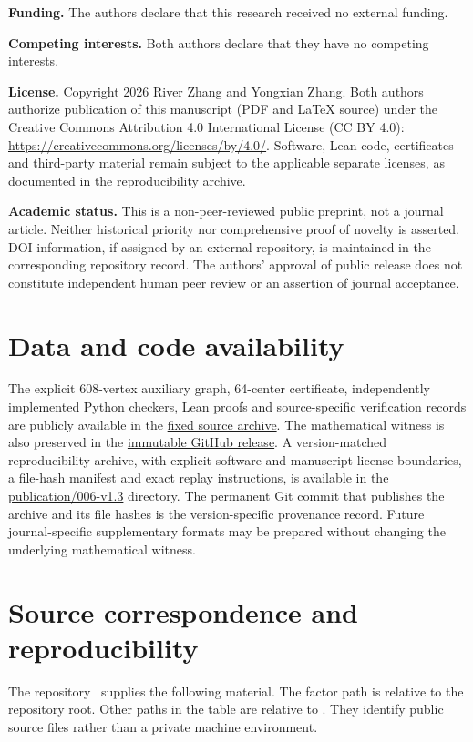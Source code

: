 \documentclass[11pt]{article}
\theoremstyle{definition}
\theoremstyle{remark}
\begin{document}
\noindent\textbf{Funding.}
The authors declare that this research received no external funding.

\noindent\textbf{Competing interests.}
Both authors declare that they have no competing interests.

\noindent\textbf{License.}
Copyright \textcopyright{} 2026 River Zhang and Yongxian Zhang.
Both authors authorize publication of this manuscript (PDF and
LaTeX source) under the Creative Commons Attribution 4.0
International License (CC BY 4.0):
\url{https://creativecommons.org/licenses/by/4.0/}.
Software, Lean code, certificates and third-party material remain
subject to the applicable separate licenses, as documented in the
reproducibility archive.

\noindent\textbf{Academic status.}
This is a non-peer-reviewed public preprint, not a journal
article. Neither historical priority nor comprehensive proof of
novelty is asserted. DOI information, if assigned by an external
repository, is maintained in the corresponding repository record.
The authors' approval of public release does not constitute
independent human peer review or an assertion of journal acceptance.

\section{Data and code availability}\label{sec:data}
The explicit 608-vertex auxiliary graph, 64-center certificate,
independently implemented Python checkers, Lean proofs and
source-specific verification records are publicly available in
the \href{https://github.com/mio-qwq/math/tree/9e217c0d18862f650ae2592ee2b83863281e6115/006-strong-product-packing-counterexample}{fixed source archive}.
The mathematical witness is also preserved in the
\href{https://github.com/mio-qwq/math/releases/tag/006-strong-product-conjecture-counterexample-2026-10-09}{immutable GitHub release}.
A version-matched reproducibility archive, with explicit
software and manuscript license boundaries, a file-hash manifest
and exact replay instructions, is available in the
\href{https://github.com/mio-qwq/math/tree/main/publication/006-v1.3}{publication/006-v1.3}
directory. The permanent Git commit that publishes the archive
and its file hashes is the version-specific provenance record.
Future journal-specific supplementary formats may be prepared
without changing the underlying mathematical witness.

\appendix
\section{Source correspondence and reproducibility}\label{app:repro}
The repository~\cite{repository} supplies the following material.
The factor path is relative to the repository root. Other paths in
the table are relative to
.
They identify public source files rather than a private machine environment.
\end{document}
